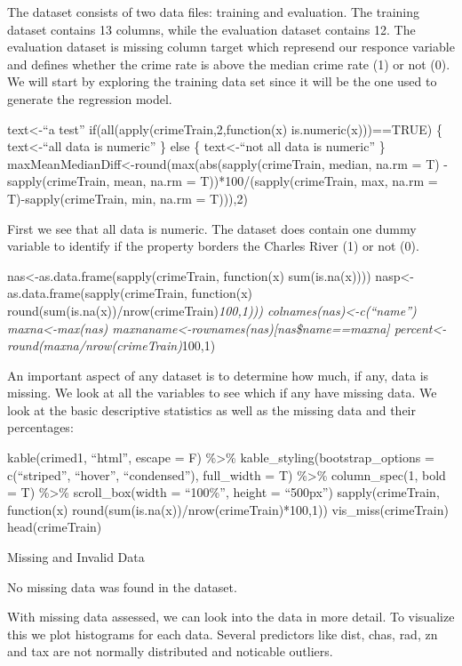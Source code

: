 \documentclass[
]{article}
\begin{document}
The dataset consists of two data files: training and evaluation. The
training dataset contains 13 columns, while the evaluation dataset
contains 12. The evaluation dataset is missing column target which
represend our responce variable and defines whether the crime rate is
above the median crime rate (1) or not (0). We will start by exploring
the training data set since it will be the one used to generate the
regression model.

text\textless-``a test'' if(all(apply(crimeTrain,2,function(x)
is.numeric(x)))==TRUE) \{ text\textless-``all data is numeric'' \} else
\{ text\textless-``not all data is numeric'' \}
maxMeanMedianDiff\textless-round(max(abs(sapply(crimeTrain, median,
na.rm = T) - sapply(crimeTrain, mean, na.rm =
T))*100/(sapply(crimeTrain, max, na.rm = T)-sapply(crimeTrain, min,
na.rm = T))),2)

First we see that all data is numeric. The dataset does contain one
dummy variable to identify if the property borders the Charles River (1)
or not (0).

nas\textless-as.data.frame(sapply(crimeTrain, function(x)
sum(is.na(x)))) nasp\textless-as.data.frame(sapply(crimeTrain,
function(x) round(sum(is.na(x))/nrow(crimeTrain)\emph{100,1)))
colnames(nas)\textless-c(``name'') maxna\textless-max(nas)
maxnaname\textless-rownames(nas){[}nas\$name==maxna{]}
percent\textless-round(maxna/nrow(crimeTrain)}100,1)

An important aspect of any dataset is to determine how much, if any,
data is missing. We look at all the variables to see which if any have
missing data. We look at the basic descriptive statistics as well as the
missing data and their percentages:

kable(crimed1, ``html'', escape = F) \%\textgreater\%
kable\_styling(bootstrap\_options = c(``striped'', ``hover'',
``condensed''), full\_width = T) \%\textgreater\% column\_spec(1, bold =
T) \%\textgreater\% scroll\_box(width = ``100\%'', height = ``500px'')
sapply(crimeTrain, function(x)
round(sum(is.na(x))/nrow(crimeTrain)*100,1)) vis\_miss(crimeTrain)
head(crimeTrain)

Missing and Invalid Data

No missing data was found in the dataset.

With missing data assessed, we can look into the data in more detail. To
visualize this we plot histograms for each data. Several predictors like
dist, chas, rad, zn and tax are not normally distributed and noticable
outliers.
\end{document}
